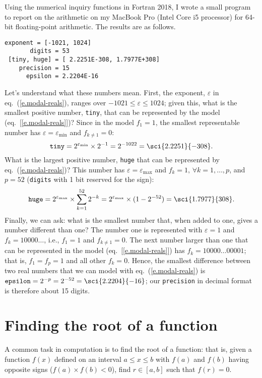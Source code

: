 Using the numerical inquiry functions in Fortran 2018, I wrote a small program to report on the arithmetic on my MacBook Pro (Intel Core i5 processor) for 64-bit floating-point arithmetic. The results are as follows.
\begin{Verbatim}[numbers=none]
     exponent = [-1021, 1024]
       digits = 53
 [tiny, huge] = [ 2.2251E-308, 1.7977E+308]
    precision = 15
      epsilon = 2.2204E-16
\end{Verbatim}
Let's understand what these numbers mean.
First, the exponent, $\varepsilon$ in eq.~(\ref{e.modal-reals}), ranges over $-1021\le\varepsilon\le1024$;%
given this, what is the smallest positive number, \texttt{tiny}, that can be represented by the model (eq.~[\ref{e.modal-reals}])? Since in the model $f_{1}=1$, the smallest representable number has $\varepsilon = \varepsilon_{\min}$ and $f_{k\neq 1} = 0$:
\[\mathtt{tiny} = 2^{\varepsilon_{\min}}\times 2^{-1} = 2^{-1022} = \sci{2.2251}{-308}.\]
What is the largest positive number, \texttt{huge} that can be represented by eq.~(\ref{e.modal-reals})? This number has $\varepsilon=\varepsilon_{\max}$ and $f_{k}=1,\,\forall k=1,\ldots,p$, and $p = 52$ (\texttt{digits} with 1 bit reserved for the sign):
\[
\mathtt{huge} = 2^{\varepsilon_{\max}}\times \sum_{k=1}^{52} 2^{-k} = 2^{\varepsilon_{\max}}\times(1-2^{-52}) = \sci{1.7977}{308}.
\]
Finally, we can ask: what is the smallest number that, when added to one, gives a number different than one? The number one is represented with $\varepsilon = 1$ and $f_{k} = 10000\ldots$, i.e., $f_{1}=1$ and $f_{k\neq1}=0$. The next number larger than one that can be represented in the model (eq.~[\ref{e.modal-reals}]) has $f_{k} = 10000\ldots00001$; that is, $f_{1}=f_{p}=1$ and all other $f_{k}=0$. Hence, the smallest difference between two real numbers that we can model with eq.~(\ref{e.modal-reals}) is $\mathtt{epsilon} = 2^{-p} = 2^{-52} = \sci{2.2204}{-16}$; our \verb+precision+ in decimal format is therefore about 15 digits.

\section{Finding the root of a function}
A common task in computation is to find the root of a function: that is, given a function $f(x)$ defined on an interval $a\le x\le b$ with $f(a)$ and $f(b)$ having opposite signs ($f(a)\times f(b) < 0$), find $r\in[a,b]$ such that $f(r) = 0$.

